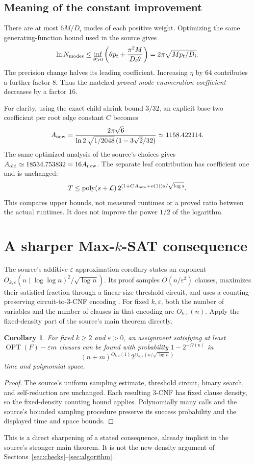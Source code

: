 \documentclass[11pt]{article}
\newtheorem{corollary}[theorem]{Corollary}
\theoremstyle{remark}
\newcommand{\poly}{\operatorname{poly}}
\begin{document}
\subsection{Meaning of the constant improvement}
There are at most \(6M/D_i\) modes of each positive weight.
Optimizing the same generating-function bound used in the source gives
\[
 \ln N_{\rm modes}
 \le\inf_{\theta>0}
       \left(\theta p_t+\frac{\pi^2M}{D_i\theta}\right)
 =2\pi\sqrt{Mp_t/D_i}.
\]
The precision change halves its leading coefficient.
Increasing \(\eta\) by \(64\) contributes a further factor \(8\).
Thus the matched \emph{proved mode-enumeration coefficient} decreases
by a factor \(16\).

For clarity, using the exact child shrink bound \(3/32\), an explicit
base-two coefficient per root edge constant \(C\) becomes
\[
 A_{\rm new}
 =\frac{2\pi\sqrt6}
        {\ln2\,\sqrt{1/2048}\,(1-3\sqrt2/32)}
 \simeq1158.422114.
\]
The same optimized analysis of the source's choices gives
\(A_{\rm old}\simeq18534.753832=16A_{\rm new}\).
The separate leaf contribution has coefficient one and is unchanged:
\[
 T\le\poly(s+\mathcal L)\,
 2^{(1+C A_{\rm new}+o(1))s/\sqrt{\log s}}.
\]
This compares upper bounds, not measured runtimes or a proved ratio
between the actual runtimes. It does not improve the power \(1/2\)
of the logarithm.

\section{A sharper \texorpdfstring{Max-\(k\)-SAT}{Max-k-SAT} consequence}\label{sec:maxsat}
The source's additive-\(\varepsilon\) approximation corollary states an
exponent \(O_{k,\varepsilon}(n(\log\log n)^2/\sqrt{\log n})\).
Its proof samples \(O(n/\varepsilon^2)\) clauses, maximizes their
satisfied fraction through a linear-size threshold circuit, and uses
a counting-preserving circuit-to-\(3\)-CNF encoding
\cite{OAI26}. For fixed \(k,\varepsilon\), both the number of variables
and the number of clauses in that encoding are \(O_{k,\varepsilon}(n)\).
Apply the fixed-density part of the source's main theorem directly.

\begin{corollary}\label{cor:maxsat}
For fixed \(k\ge2\) and \(\varepsilon>0\), an assignment satisfying at
least \(\operatorname{OPT}(F)-\varepsilon m\) clauses can be found with
probability \(1-2^{-\Omega(n)}\) in
\[
 (n+m)^{O_{k,\varepsilon}(1)}
 2^{O_{k,\varepsilon}(n/\sqrt{\log n})}
\]
time and polynomial space.
\end{corollary}
\begin{proof}
The source's uniform sampling estimate, threshold circuit, binary
search, and self-reduction are unchanged.
Each resulting \(3\)-CNF has fixed clause density, so the
fixed-density counting bound applies. Polynomially many calls and
the source's bounded sampling procedure preserve its success
probability and the displayed time and space bounds.
\end{proof}
This is a direct sharpening of a stated consequence, already implicit
in the source's stronger main theorem. It is not the new density
argument of Sections~\ref{sec:checks}--\ref{sec:algorithm}.
\end{document}
